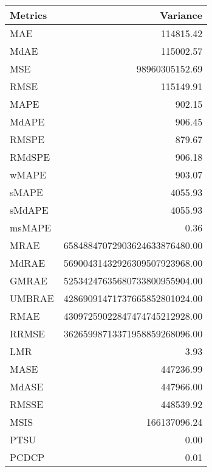 \begin{tabular}{lr}
\toprule
Metrics & Variance \\
\midrule
MAE & 114815.42 \\
MdAE & 115002.57 \\
MSE & 98960305152.69 \\
RMSE & 115149.91 \\
MAPE & 902.15 \\
MdAPE & 906.45 \\
RMSPE & 879.67 \\
RMdSPE & 906.18 \\
wMAPE & 903.07 \\
sMAPE & 4055.93 \\
sMdAPE & 4055.93 \\
msMAPE & 0.36 \\
MRAE & 65848847072903624633876480.00 \\
MdRAE & 56900431432926309507923968.00 \\
GMRAE & 52534247635680733800955904.00 \\
UMBRAE & 42869091471737665852801024.00 \\
RMAE & 43097259022847474745212928.00 \\
RRMSE & 36265998713371958859268096.00 \\
LMR & 3.93 \\
MASE & 447236.99 \\
MdASE & 447966.00 \\
RMSSE & 448539.92 \\
MSIS & 166137096.24 \\
PTSU & 0.00 \\
PCDCP & 0.01 \\
\bottomrule
\end{tabular}
